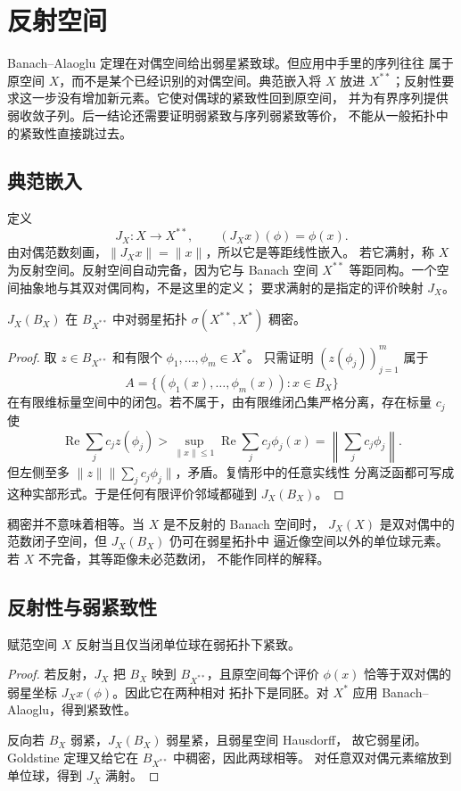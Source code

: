 \chapter{反射空间}
\label{chap:reflexive-spaces}

Banach--Alaoglu 定理在对偶空间给出弱星紧致球。但应用中手里的序列往往
属于原空间 \(X\)，而不是某个已经识别的对偶空间。典范嵌入将 \(X\) 放进
\(X^{**}\)；反射性要求这一步没有增加新元素。它使对偶球的紧致性回到原空间，
并为有界序列提供弱收敛子列。后一结论还需要证明弱紧致与序列弱紧致等价，
不能从一般拓扑中的紧致性直接跳过去。

\section{典范嵌入}

定义
\[
 J_X:X\longrightarrow X^{**},\qquad (J_Xx)(\phi)=\phi(x).
\]
由对偶范数刻画，\(\|J_Xx\|=\|x\|\)，所以它是等距线性嵌入。
若它满射，称 \(X\) 为反射空间。反射空间自动完备，因为它与 Banach
空间 \(X^{**}\) 等距同构。一个空间抽象地与其双对偶同构，不是这里的定义；
要求满射的是指定的评价映射 \(J_X\)。

\begin{theorem}[Goldstine]\label{thm:goldstine}
\(J_X(B_X)\) 在 \(B_{X^{**}}\) 中对弱星拓扑 \(\sigma(X^{**},X^*)\) 稠密。
\end{theorem}
\begin{proof}
取 \(z\in B_{X^{**}}\) 和有限个 \(\phi_1,\ldots,\phi_m\in X^*\)。
只需证明 \((z(\phi_j))_{j=1}^m\) 属于
\[
 A=\{(\phi_1(x),\ldots,\phi_m(x)):x\in B_X\}
\]
在有限维标量空间中的闭包。若不属于，由有限维闭凸集严格分离，存在标量
\(c_j\) 使
\[
 \operatorname{Re}\sum_jc_jz(\phi_j)>
 \sup_{\|x\|\le1}\operatorname{Re}\sum_jc_j\phi_j(x)
 =\left\|\sum_jc_j\phi_j\right\|.
\]
但左侧至多 \(\|z\|\|\sum_jc_j\phi_j\|\)，矛盾。复情形中的任意实线性
分离泛函都可写成这种实部形式。于是任何有限评价邻域都碰到 \(J_X(B_X)\)。
\end{proof}

稠密并不意味着相等。当 \(X\) 是不反射的 Banach 空间时，
\(J_X(X)\) 是双对偶中的范数闭子空间，但 \(J_X(B_X)\) 仍可在弱星拓扑中
逼近像空间以外的单位球元素。若 \(X\) 不完备，其等距像未必范数闭，
不能作同样的解释。

\section{反射性与弱紧致性}

\begin{theorem}\label{thm:reflexive-weak-ball}
赋范空间 \(X\) 反射当且仅当闭单位球在弱拓扑下紧致。
\end{theorem}
\begin{proof}
若反射，\(J_X\) 把 \(B_X\) 映到 \(B_{X^{**}}\)，且原空间每个评价
\(\phi(x)\) 恰等于双对偶的弱星坐标 \(J_Xx(\phi)\)。因此它在两种相对
拓扑下是同胚。对 \(X^*\) 应用 Banach--Alaoglu，得到紧致性。

反向若 \(B_X\) 弱紧，\(J_X(B_X)\) 弱星紧，且弱星空间 Hausdorff，
故它弱星闭。Goldstine 定理又给它在 \(B_{X^{**}}\) 中稠密，因此两球相等。
对任意双对偶元素缩放到单位球，得到 \(J_X\) 满射。
\end{proof}

